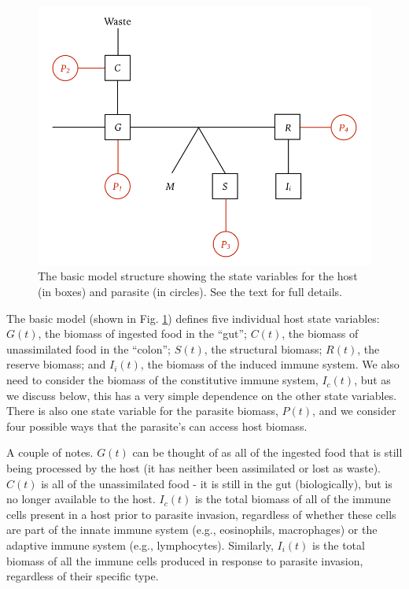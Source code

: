 \documentclass[11pt,reqno,final,pdftex]{amsart}\usepackage[]{graphicx}\usepackage[]{color}
\theoremstyle{plain}
\numberwithin{equation}{part}
\begin{document}
\begin{figure}
\includegraphics[width=\textwidth]{Macroparasite_DEB.png}
\caption{The basic model structure showing the state variables for the host (in boxes) and parasite (in circles). See the text for full details.}
\label{fig:model}
\end{figure}

The basic model (shown in Fig. \ref{fig:model}) defines five individual host state variables: $G(t)$, the biomass of ingested food in the ``gut''; $C(t)$, the biomass of unassimilated food in the ``colon''; $S(t)$, the structural biomass; $R(t)$, the reserve biomass; and $I_i(t)$, the biomass of the induced immune system.
We also need to consider the biomass of the constitutive immune system, $I_c(t)$, but as we discuss below, this has a very simple dependence on the other state variables.
There is also one state variable for the parasite biomass, $P(t)$, and we consider four possible ways that the parasite's can access host biomass.

A couple of notes.
$G(t)$ can be thought of as all of the ingested food that is still being processed by the host (it has neither been assimilated or lost as waste).
$C(t)$ is all of the unassimilated food - it is still in the gut (biologically), but is no longer available to the host.
$I_c(t)$ is the total biomass of all of the immune cells present in a host prior to parasite invasion, regardless of whether these cells are part of the innate immune system (e.g., eosinophils, macrophages) or the adaptive immune system (e.g., lymphocytes).
Similarly, $I_i(t)$ is the total biomass of all the immune cells produced in response to parasite invasion, regardless of their specific type.
\end{document}
